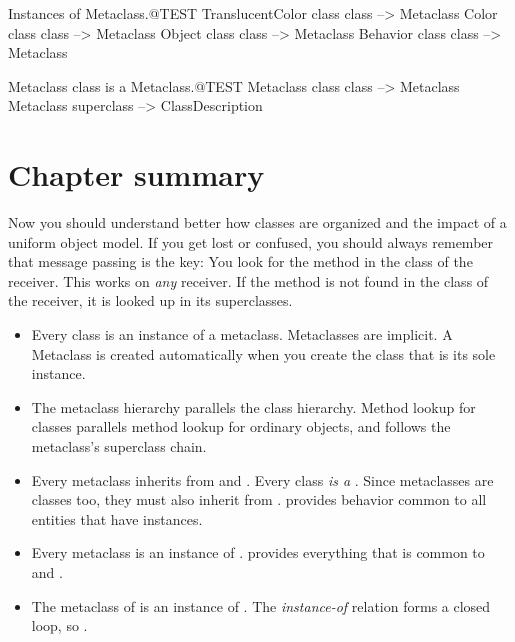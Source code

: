 \documentclass[a4paper,10pt,twoside]{book}
\begin{document}
\begin{example}{Instances of Metaclass.}{@TEST}
TranslucentColor class class --> Metaclass
Color class class                   --> Metaclass
Object class class                 --> Metaclass
Behavior class class              --> Metaclass
\end{example}

\begin{example}{Metaclass class is a Metaclass.}{@TEST}
Metaclass class class --> Metaclass
Metaclass superclass --> ClassDescription
\end{example}

\section{Chapter summary}
Now you should understand better how classes are organized and the impact of a uniform object model.
If you get lost or confused, you should always remember that message passing is the key:
You look for the method in the class of the receiver.
This works on \emph{any} receiver.
If the method is not found in the class of the receiver, it is looked up in its superclasses.

\begin{itemize}
\item Every class is an instance of a metaclass.
	Metaclasses are implicit.
	A Metaclass is created automatically when you create the class that is its sole instance.

\item The metaclass hierarchy parallels the class hierarchy.
	Method lookup for classes parallels method lookup for ordinary objects, and follows the metaclass's superclass chain.

\item Every metaclass inherits from  and .
	Every class \emph{is a} . Since metaclasses are classes too, they must also inherit from .
	 provides behavior common to all entities that have instances.

\item Every metaclass is an instance of .
	 provides everything that is common to  and .

\item The metaclass of  is an instance of .
	The \emph{instance-of} relation forms a closed loop, so .
\end{itemize}
\ifx\wholebook\relax\else
\end{document}
